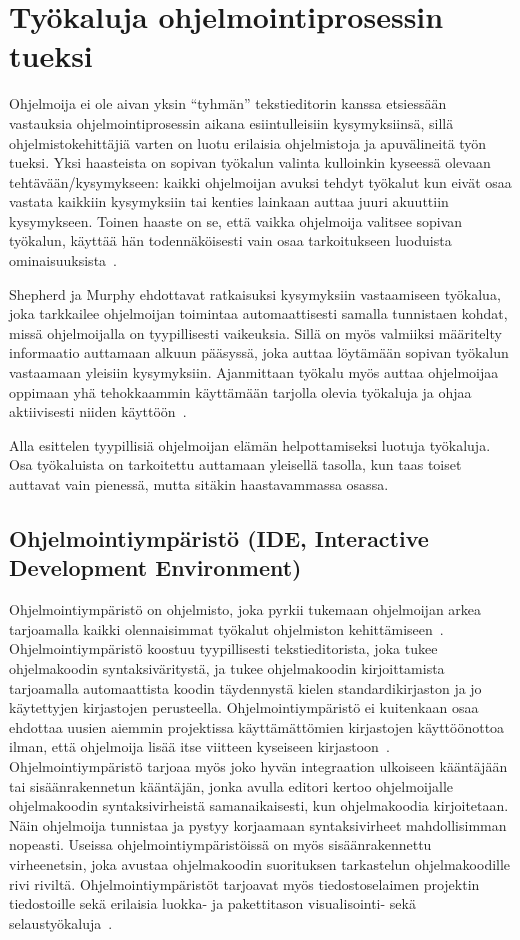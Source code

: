 \documentclass[finnish]{tktltiki2}
\theoremstyle{definition}
\theoremstyle{remark}
\begin{document}
\section{Työkaluja ohjelmointiprosessin tueksi}
Ohjelmoija ei ole aivan yksin ``tyhmän'' tekstieditorin kanssa etsiessään vastauksia ohjelmointiprosessin aikana esiintulleisiin kysymyksiinsä, sillä ohjelmistokehittäjiä varten on luotu erilaisia ohjelmistoja ja apuvälineitä työn tueksi.
Yksi haasteista on sopivan työkalun valinta kulloinkin kyseessä olevaan tehtävään/kysymykseen: kaikki ohjelmoijan avuksi tehdyt työkalut kun eivät osaa vastata kaikkiin kysymyksiin tai kenties lainkaan auttaa juuri akuuttiin kysymykseen. Toinen haaste on se, että vaikka ohjelmoija valitsee sopivan työkalun, käyttää hän todennäköisesti vain osaa tarkoitukseen luoduista ominaisuuksista~\cite{whyline}.

Shepherd ja Murphy ehdottavat ratkaisuksi kysymyksiin vastaamiseen työkalua, joka tarkkailee ohjelmoijan toimintaa automaattisesti samalla tunnistaen kohdat, missä ohjelmoijalla on tyypillisesti vaikeuksia. Sillä on myös valmiiksi määritelty informaatio auttamaan alkuun pääsyssä, joka auttaa löytämään sopivan työkalun vastaamaan yleisiin kysymyksiin. Ajanmittaan työkalu myös auttaa ohjelmoijaa oppimaan yhä tehokkaammin käyttämään tarjolla olevia työkaluja ja ohjaa aktiivisesti niiden käyttöön~\cite{programmers-coach}.

Alla esittelen tyypillisiä ohjelmoijan elämän helpottamiseksi luotuja työkaluja. Osa työkaluista on tarkoitettu auttamaan yleisellä tasolla, kun taas toiset auttavat vain pienessä, mutta sitäkin haastavammassa osassa.



\subsection{Ohjelmointiympäristö (IDE, Interactive Development Environment)}
Ohjelmointiympäristö on ohjelmisto, joka pyrkii tukemaan ohjelmoijan arkea tarjoamalla kaikki olennaisimmat työkalut ohjelmiston kehittämiseen~\cite{eclipse-ide}. Ohjelmointiympäristö koostuu tyypillisesti tekstieditorista, joka tukee ohjelmakoodin syntaksiväritystä, ja tukee  ohjelmakoodin kirjoittamista tarjoamalla automaattista koodin täydennystä kielen standardikirjaston ja jo käytettyjen kirjastojen perusteella. Ohjelmointiympäristö ei kuitenkaan osaa ehdottaa uusien aiemmin projektissa käyttämättömien kirjastojen käyttöönottoa ilman, että ohjelmoija lisää itse viitteen kyseiseen kirjastoon~\cite{jungloid-mining}.
Ohjelmointiympäristö tarjoaa myös joko hyvän integraation ulkoiseen kääntäjään tai sisäänrakennetun kääntäjän, jonka avulla editori kertoo ohjelmoijalle ohjelmakoodin syntaksivirheistä samanaikaisesti, kun ohjelmakoodia kirjoitetaan. Näin ohjelmoija tunnistaa ja pystyy korjaamaan syntaksivirheet mahdollisimman nopeasti.
Useissa ohjelmointiympäristöissä on myös sisäänrakennettu virheenetsin, joka avustaa ohjelmakoodin suorituksen tarkastelun ohjelmakoodille rivi riviltä. Ohjelmointiympäristöt tarjoavat myös tiedostoselaimen projektin tiedostoille sekä erilaisia luokka- ja pakettitason visualisointi- sekä selaustyökaluja~\cite{eclipse-ide}.
\end{document}

